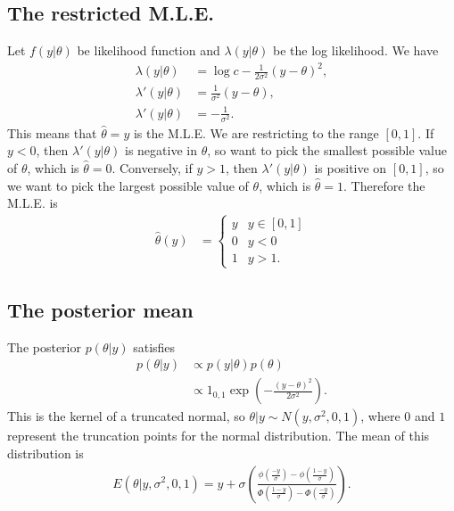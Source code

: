 \documentclass[a4paper,10pt]{article}
\newcommand{\htheta}{\hat{\theta}}
\begin{document}
\subsection{The restricted M.L.E.}
Let $f(y|\theta)$ be likelihood function and $\lambda(y|\theta)$ be the log likelihood.  We have
\begin{align*}
\lambda(y|\theta) &= \log{c} - \frac{1}{2\sigma^{2}}(y - \theta)^{2}, \\
\lambda'(y|\theta) &= \frac{1}{\sigma^{2}}(y - \theta), \\
\lambda'(y|\theta) &= -\frac{1}{\sigma^{2}}.
\end{align*}
This means that $\htheta = y$ is the M.L.E.  We are restricting to the range $[0,1]$.  If $y<0$, then $\lambda'(y|\theta)$ is negative in $\theta$, so want to pick the smallest possible value of $\theta$, which is $\htheta = 0$.  Conversely, if $y > 1$, then $\lambda'(y|\theta)$ is positive on $[0,1]$, so we want to pick the largest possible value of $\theta$, which is $\htheta = 1$.  Therefore the M.L.E. is
\begin{align*}
\htheta(y) &= \begin{cases}
y & y \in [0,1] \\
0 & y < 0 \\
1 & y > 1. \end{cases}
\end{align*}
\subsection{The posterior mean}
The posterior $p(\theta|y)$ satisfies
\begin{align*}
p(\theta|y) &\propto p(y|\theta)p(\theta) \\
&\propto 1_{0,1}\exp\left(-\frac{(y-\theta)^{2}}{2\sigma^{2}}\right).
\end{align*}
This is the kernel of a truncated normal, so $\theta|y \sim N(y,\sigma^2, 0, 1)$, where $0$ and $1$ represent the truncation points for the normal distribution.  The mean of this distribution is
\begin{align}\label{truncmean}
 E(\theta|y,\sigma^2,0,1) = y + \sigma\left(\frac{\phi\left(\frac{-y}{\sigma}\right)-\phi\left(\frac{1-y}{\sigma}\right)}{\Phi\left(\frac{1-y}{\sigma}\right)-\Phi\left(\frac{-y}{\sigma}\right)}\right).
\end{align}
\end{document}
